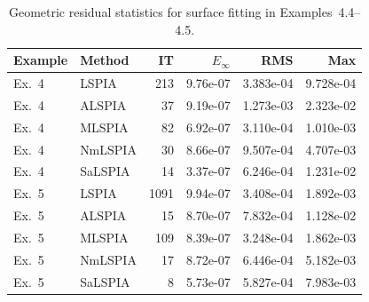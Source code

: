 \begin{table}[t]
\centering
\caption{Geometric residual statistics for surface fitting in Examples~4.4--4.5.}
\begin{tabular}{llrrrr}
\hline
Example & Method & IT & $E_\infty$ & RMS & Max \\
\hline
Ex.~4 & LSPIA & 213 & 9.76e-07 & 3.383e-04 & 9.728e-04 \\
Ex.~4 & ALSPIA & 37 & 9.19e-07 & 1.273e-03 & 2.323e-02 \\
Ex.~4 & MLSPIA & 82 & 6.92e-07 & 3.110e-04 & 1.010e-03 \\
Ex.~4 & NmLSPIA & 30 & 8.66e-07 & 9.507e-04 & 4.707e-03 \\
Ex.~4 & SaLSPIA & 14 & 3.37e-07 & 6.246e-04 & 1.231e-02 \\
Ex.~5 & LSPIA & 1091 & 9.94e-07 & 3.408e-04 & 1.892e-03 \\
Ex.~5 & ALSPIA & 15 & 8.70e-07 & 7.832e-04 & 1.128e-02 \\
Ex.~5 & MLSPIA & 109 & 8.39e-07 & 3.248e-04 & 1.862e-03 \\
Ex.~5 & NmLSPIA & 17 & 8.72e-07 & 6.446e-04 & 5.182e-03 \\
Ex.~5 & SaLSPIA & 8 & 5.73e-07 & 5.827e-04 & 7.983e-03 \\
\hline
\end{tabular}
\end{table}
